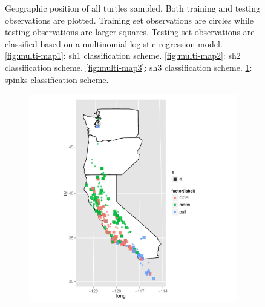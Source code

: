 \documentclass{article}\usepackage{graphicx, color}
\begin{document}
\begin{figure}[t]
\begin{subfigure}[b]{0.5\textwidth}
    \label{fig:multi-map4}
  \end{subfigure}
  \caption{Geographic position of all turtles sampled. Both training and testing observations are plotted. Training set observations are circles while testing observations are larger squares. Testing set observations are classified based on a multinomial logistic regression model. \ref{fig:multi-map1}: sh1 classification scheme. \ref{fig:multi-map2}: sh2 classification scheme. \ref{fig:multi-map3}: sh3 classification scheme. \ref{fig:multi-map4}: spinks classification scheme.}
  \label{fig:multi-map}
\end{figure}




\begin{figure}[t]
  \centering
  \begin{subfigure}[b]{0.5\textwidth}
    \centering
    \caption{}
    \includegraphics[width = \textwidth]{figure/nnet-map1}
    \label{fig:nnet-map1}
  \end{subfigure}%
  \begin{subfigure}[b]{0.5\textwidth}
    \centering
    \caption{}

\end{subfigure}
\end{figure}
\end{document}
